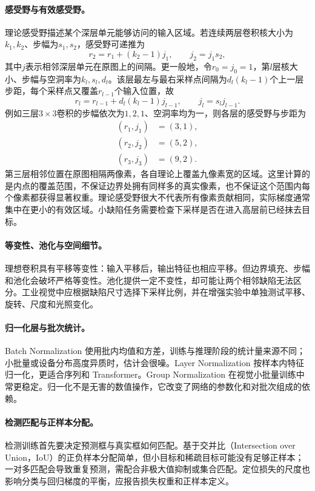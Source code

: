 \paragraph{感受野与有效感受野。}
理论感受野描述某个深层单元能够访问的输入区域。若连续两层卷积核大小为$k_1,k_2$、步幅为$s_1,s_2$，感受野可递推为
\begin{equation}
 r_2=r_1+(k_2-1)j_1,\qquad j_2=j_1s_2,
\end{equation}
其中$j$表示相邻深层单元在原图上的间隔。更一般地，令$r_0=j_0=1$，第$l$层核大小、步幅与空洞率为$k_l,s_l,d_l$。该层最左与最右采样点间隔为$d_l(k_l-1)$个上一层步距，每个采样点又覆盖$r_{l-1}$个输入位置，故
\begin{equation}
 r_l=r_{l-1}+d_l(k_l-1)j_{l-1},\qquad j_l=s_lj_{l-1}.
\end{equation}
例如三层$3\times3$卷积的步幅依次为$1,2,1$、空洞率均为一，则各层的感受野与步距为
\begin{align*}
 (r_1,j_1)&=(3,1),\\
 (r_2,j_2)&=(5,2),\\
 (r_3,j_3)&=(9,2).
\end{align*}
第三层相邻位置在原图相隔两像素，各自理论上覆盖九像素宽的区域。这里计算的是内点的覆盖范围，不保证边界处拥有同样多的真实像素，也不保证这个范围内每个像素都获得显著权重。理论感受野很大不代表所有像素贡献相同，实际梯度通常集中在更小的有效区域。小缺陷任务需要检查下采样是否在进入高层前已经抹去目标。

\paragraph{等变性、池化与空间细节。}
理想卷积具有平移等变性：输入平移后，输出特征也相应平移。但边界填充、步幅和池化会破坏严格等变性。池化提供一定不变性，却可能让两个相邻缺陷无法区分。工业视觉中应根据缺陷尺寸选择下采样比例，并在增强实验中单独测试平移、旋转、尺度和光照变化。

\paragraph{归一化层与批次统计。}
Batch Normalization 使用批内均值和方差，训练与推理阶段的统计量来源不同；小批量或设备分布高度异质时，估计会很噪。Layer Normalization 按样本内特征归一化，更适合序列和 Transformer。Group Normalization 在视觉小批量训练中常更稳定。归一化不是无害的数值操作，它改变了网络的参数化和对批次组成的依赖。

\paragraph{检测匹配与正样本分配。}
检测训练首先要决定预测框与真实框如何匹配。基于交并比（Intersection over Union，IoU）的正负样本分配简单，但小目标和稀疏目标可能没有足够正样本；一对多匹配会导致重复预测，需配合非极大值抑制或集合匹配。定位损失的尺度也影响分类与回归梯度的平衡，应报告损失权重和正样本定义。

